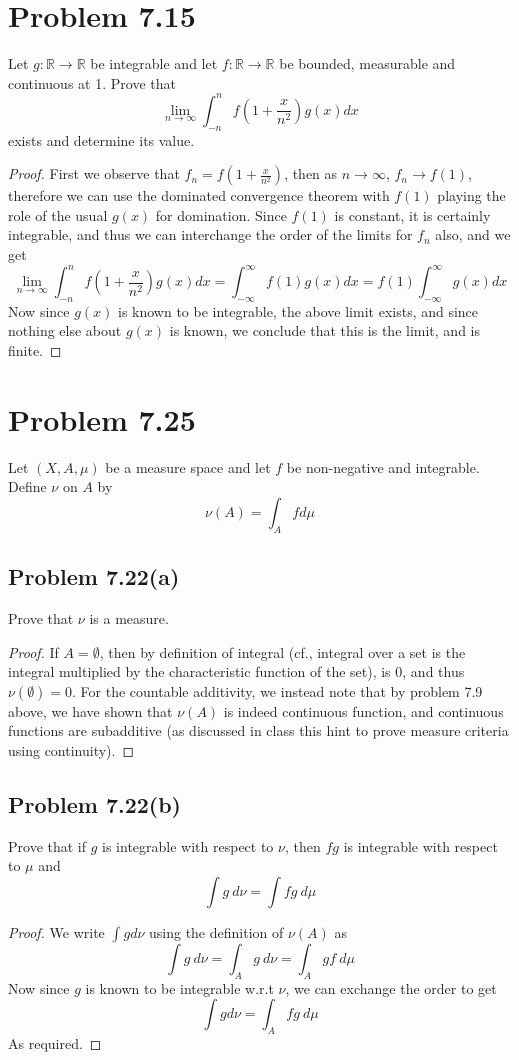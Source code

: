 \documentclass{article}
\def\RR{\mathbb R}
\begin{document}
\section*{Problem 7.15}Let $g:\RR\to\RR$ be integrable and let $f:\RR\to\RR$
be bounded, measurable and continuous at 1. Prove that
\[
\lim_{n\to\infty} \int_{-n}^n f\left( 1 + \frac{x}{n^2}\right) g(x) dx
\]
exists and determine its value.
\begin{proof}
First we observe that $f_n=f\left( 1 + \frac{x}{n^2}\right)$, then
as $n\to\infty$, $f_n\to f(1)$, therefore we can use the dominated convergence
theorem with $f(1)$ playing the role of the usual $g(x)$ for domination.
Since $f(1)$ is constant, it is certainly integrable, and thus we 
can interchange the order of the limits for $f_n$ also, and we get
\[
\lim_{n\to\infty} \int_{-n}^n f\left( 1 + \frac{x}{n^2}\right) g(x) dx =
\int_{-\infty}^\infty f(1)g(x) dx =
f(1)\int_{-\infty}^\infty g(x) dx
\]
Now since $g(x)$ is known to be integrable, the above limit exists, and
since nothing else about $g(x)$ is known, we conclude that this is the limit,
and is finite.
\end{proof}

\section*{Problem 7.25}Let $(X,A,\mu)$ be a measure space and let $f$ be 
non-negative and integrable. Define $\nu$ on $A$ by
\[
\nu(A) = \int_A f d\mu
\]
\subsection*{Problem 7.22(a)} Prove that $\nu$ is a measure.
\begin{proof}
If $A=\emptyset$, then by definition of integral (cf., integral over
a set is the integral multiplied by the characteristic function of the set),
is 0, and thus $\nu(\emptyset)=0$. For the countable additivity, we instead
note that by problem 7.9 above, we have shown that $\nu(A)$ is indeed
continuous function, and continuous functions are subadditive (as discussed
in class this hint to prove measure criteria using continuity).

\end{proof}
\subsection*{Problem 7.22(b)} Prove that if $g$ is integrable with respect
to $\nu$, then $fg$ is integrable with respect to $\mu$ and 
\[
\int g\ d\nu = \int fg\ d\mu
\]
\begin{proof}
We write $\int g d\nu$ using the definition of $\nu(A)$ as
\[
\int g\ d\nu = \int_{A} g\ d\nu = \int_{A} g f\ d\mu
\]
Now since $g$ is known to be integrable w.r.t $\nu$, we can 
exchange the order to get
\[
\int g d\nu = \int_A fg\ d\mu
\]
As required.
\end{proof}
\end{document}
